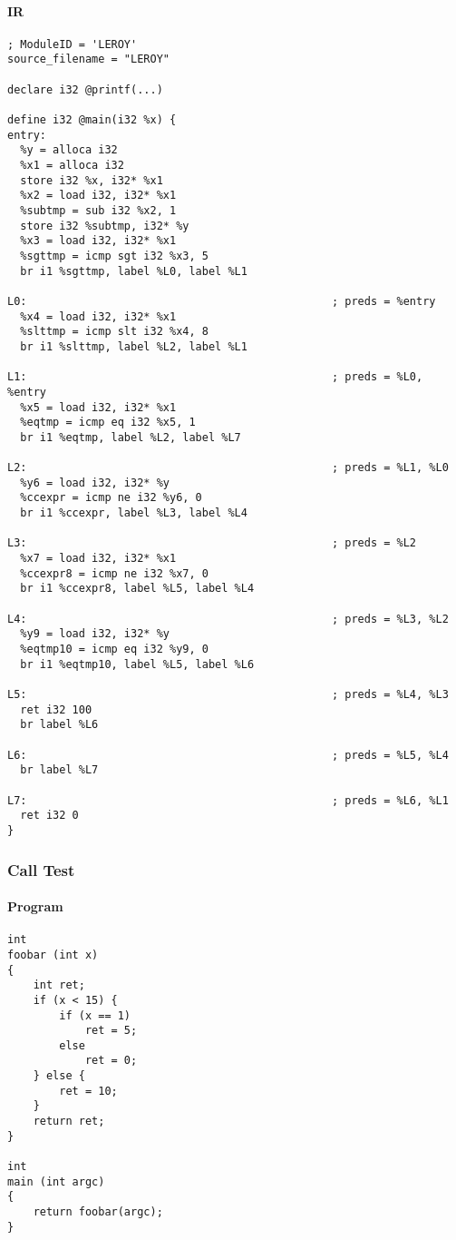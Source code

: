 \documentclass[12pt]{article}
\begin{document}
    \paragraph{IR}
    \begin{verbatim}
; ModuleID = 'LEROY'
source_filename = "LEROY"

declare i32 @printf(...)

define i32 @main(i32 %x) {
entry:
  %y = alloca i32
  %x1 = alloca i32
  store i32 %x, i32* %x1
  %x2 = load i32, i32* %x1
  %subtmp = sub i32 %x2, 1
  store i32 %subtmp, i32* %y
  %x3 = load i32, i32* %x1
  %sgttmp = icmp sgt i32 %x3, 5
  br i1 %sgttmp, label %L0, label %L1

L0:                                               ; preds = %entry
  %x4 = load i32, i32* %x1
  %slttmp = icmp slt i32 %x4, 8
  br i1 %slttmp, label %L2, label %L1

L1:                                               ; preds = %L0, %entry
  %x5 = load i32, i32* %x1
  %eqtmp = icmp eq i32 %x5, 1
  br i1 %eqtmp, label %L2, label %L7

L2:                                               ; preds = %L1, %L0
  %y6 = load i32, i32* %y
  %ccexpr = icmp ne i32 %y6, 0
  br i1 %ccexpr, label %L3, label %L4

L3:                                               ; preds = %L2
  %x7 = load i32, i32* %x1
  %ccexpr8 = icmp ne i32 %x7, 0
  br i1 %ccexpr8, label %L5, label %L4

L4:                                               ; preds = %L3, %L2
  %y9 = load i32, i32* %y
  %eqtmp10 = icmp eq i32 %y9, 0
  br i1 %eqtmp10, label %L5, label %L6

L5:                                               ; preds = %L4, %L3
  ret i32 100
  br label %L6

L6:                                               ; preds = %L5, %L4
  br label %L7

L7:                                               ; preds = %L6, %L1
  ret i32 0
}
    \end{verbatim}

    \newpage
    \subsubsection{Call Test}
    \paragraph{Program}
    \begin{verbatim}
int
foobar (int x)
{
    int ret;
    if (x < 15) {
        if (x == 1)
            ret = 5;
        else
            ret = 0;
    } else {
        ret = 10;
    }
    return ret;
}

int
main (int argc)
{
    return foobar(argc);
}
    \end{verbatim}
\end{document}
